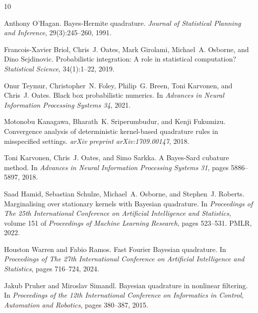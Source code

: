 \documentclass{article}
\begin{document}
{\small

\begin{thebibliography}{10}

Anthony O'Hagan.
\newblock Bayes-Hermite quadrature.
\newblock \emph{Journal of Statistical Planning and Inference}, 29(3):245--260, 1991.

Francois-Xavier Briol, Chris~J. Oates, Mark Girolami, Michael~A. Osborne, and Dino Sejdinovic.
\newblock Probabilistic integration: A role in statistical computation?
\newblock \emph{Statistical Science}, 34(1):1--22, 2019.

Onur Teymur, Christopher~N. Foley, Philip~G. Breen, Toni Karvonen, and Chris~J. Oates.
\newblock Black box probabilistic numerics.
\newblock In \emph{Advances in Neural Information Processing Systems 34}, 2021.

Motonobu Kanagawa, Bharath~K. Sriperumbudur, and Kenji Fukumizu.
\newblock Convergence analysis of deterministic kernel-based quadrature rules in misspecified settings.
\newblock \emph{arXiv preprint arXiv:1709.00147}, 2018.

Toni Karvonen, Chris~J. Oates, and Simo Sarkka.
\newblock A Bayes-Sard cubature method.
\newblock In \emph{Advances in Neural Information Processing Systems 31}, pages 5886--5897, 2018.

Saad Hamid, Sebastian Schulze, Michael~A. Osborne, and Stephen~J. Roberts.
\newblock Marginalising over stationary kernels with Bayesian quadrature.
\newblock In \emph{Proceedings of The 25th International Conference on Artificial Intelligence and Statistics}, volume 151 of \emph{Proceedings of Machine Learning Research}, pages 523--531. PMLR, 2022.

Houston Warren and Fabio Ramos.
\newblock Fast Fourier Bayesian quadrature.
\newblock In \emph{Proceedings of The 27th International Conference on Artificial Intelligence and Statistics}, pages 716--724, 2024.

Jakub Pruher and Miroslav Simandl.
\newblock Bayesian quadrature in nonlinear filtering.
\newblock In \emph{Proceedings of the 12th International Conference on Informatics in Control, Automation and Robotics}, pages 380--387, 2015.


\end{thebibliography}}
\end{document}
